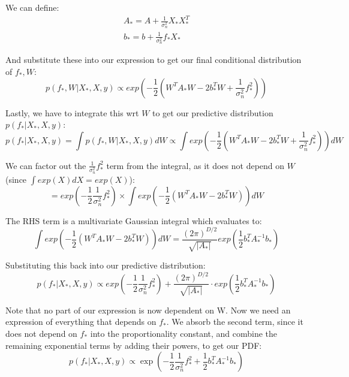 \documentclass[10pt]{article}
\begin{document}
We can define:
\begin{equation*}
    \begin{aligned}
        A_* = A + \frac{1}{\sigma^2_n}X_*X_*^T \\
        b_* = b + \frac{1}{\sigma^2_n}f_*X_*
    \end{aligned}
\end{equation*}

And substitute these into our expression to get our final conditional distribution of $f_*,W$:
\begin{equation*}
    p(f_*,W|X_*,X,y) \propto exp\left(-\frac{1}{2}\left(W^TA_*W - 2b_*^TW + \frac{1}{\sigma_n^2}f_*^2\right)\right)
\end{equation*}

Lastly, we have to integrate this wrt $W$ to get our predictive distribution $p(f_*|X_*,X,y)$:
\begin{equation*}
    p(f_*|X_*,X,y) = \int p(f_*,W|X_*,X,y)dW \propto \int exp\left(-\frac{1}{2}\left(W^TA_*W - 2b_*^TW + \frac{1}{\sigma_n^2}f_*^2\right)\right)dW
\end{equation*}

We can factor out the $\frac{1}{\sigma_n^2}f_*^2$ term from the integral, as it does not depend on $W$ (since $\int exp(X) dX = exp(X)$):
\begin{equation*}
    = exp\left(-\frac{1}{2}\frac{1}{\sigma_n^2}f_*^2\right) \times \int exp\left(-\frac{1}{2}\left(W^TA_*W - 2b_*^TW\right)\right) dW
\end{equation*}

The RHS term is a multivariate Gaussian integral which evaluates to:
\begin{equation*}
    \int exp\left(-\frac{1}{2} \left( W^TA_*W - 2b_*^TW \right) \right) dW = \frac{(2\pi)^{D/2}} {\sqrt{|A_*|}} exp\left( \frac{1}{2} b_*^TA_*^{-1}b_* \right)
\end{equation*}

Substituting this back into our predictive distribution:
\begin{equation*}
    p(f_*|X_*,X,y) \propto exp\left(-\frac{1}{2}\frac{1}{\sigma_n^2}f_*^2\right) + \frac{(2\pi)^{D/2}}{\sqrt{|A_*|}} \cdot exp\left(\frac{1}{2}b_*^TA_*^{-1}b_*\right)  
\end{equation*}
    
Note that no part of our expression is now dependent on W. Now we need an expression of everything that depends on $f_*$. We absorb the second term, since it does not depend on $f_*$ into the proportionality constant, and combine the remaining exponential terms by adding their powers, to get our PDF:
\begin{equation*}
    p(f_*|X_*,X,y) \propto \exp\left(-\frac{1}{2}\frac{1}{\sigma_n^2}f_*^2 + \frac{1}{2}b_*^TA_*^{-1}b_*\right)
\end{equation*}
\end{document}
